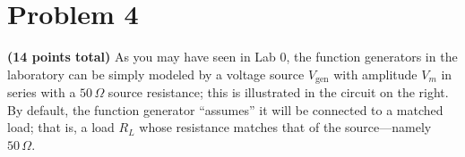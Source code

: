 \section*{Problem 4}

\textbf{(14 points total)} As you may have seen in Lab 0, the function generators in the
laboratory can be simply modeled by a voltage source $V_{\mathrm{gen}}$ with amplitude
$V_m$ in series with a $50\,\Omega$ source resistance; this is illustrated in the circuit
on the right. By default, the function generator ``assumes'' it will be connected to a
matched load; that is, a load $R_L$ whose resistance matches that of the source---namely
$50\,\Omega$.

%

